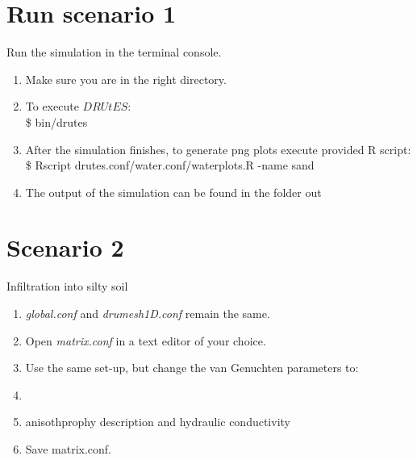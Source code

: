 \section*{Run scenario 1}
Run the simulation in the terminal console.
\begin{enumerate}
\item Make sure you are in the right directory. 
\item To execute $DRUtES$: \\
\$ bin/drutes
\item After the simulation finishes, to generate png plots execute provided R script: \\
\$ Rscript drutes.conf/water.conf/waterplots.R -name sand
\item The output of the simulation can be found in the folder out
\end{enumerate}

\section*{Scenario 2}
Infiltration into silty soil
\begin{enumerate}
\item \emph{global.conf} and \emph{drumesh1D.conf} remain the same.
\item Open \emph{matrix.conf} in a text editor of your choice. 
\item Use the same set-up, but change the van Genuchten parameters to:
\item {}
\item anisothprophy description and hydraulic conductivity\\ 
\item Save matrix.conf.
\end{enumerate}

